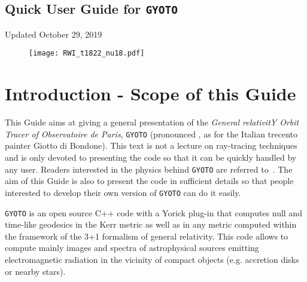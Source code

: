 \documentclass[a4paper,12pt]{article}
\begin{document}
\begin{center}
\section*{\Huge{Quick User Guide for \texttt{GYOTO}}}

\vspace{0.5cm}

\Large{Updated October 29, 2019}

\vspace{4cm}

\begin{figure}[htbp]
\centering
\texttt{[image: RWI\_t1822\_nu18.pdf]}
\end{figure}

\end{center}



\newpage

\section*{Introduction - Scope of this Guide}



This Guide aims at giving a general presentation of the \textit{General relativitY Orbit Tracer of Observatoire de Paris}, \texttt{GYOTO} (pronounced \textipa{[dZIoto]}, as for the Italian trecento painter Giotto di Bondone). This text is not a lecture on ray-tracing techniques and is only devoted to presenting the code so that it can be quickly handled by any user. Readers interested in the physics behind \texttt{GYOTO} are referred to~\citet[][and references therein]{vincent11a,vincent12a}. The aim of this Guide is also to present the code in sufficient details so that people interested to develop their own version of \texttt{GYOTO} can do it easily.

\texttt{GYOTO} is an open source C++ code with a Yorick plug-in that computes null and time-like geodesics in the Kerr metric as well as in any metric computed within the framework of the 3+1 formalism of general relativity. This code allows to compute mainly images and spectra of astrophysical sources emitting electromagnetic radiation in the vicinity of compact objects (e.g. accretion disks or nearby stars). 
\end{document}
